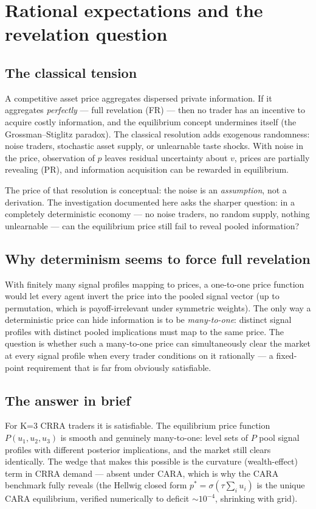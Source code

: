\documentclass[11pt]{report}
\begin{document}
\chapter{Rational expectations and the revelation question}

\section{The classical tension}
A competitive asset price aggregates dispersed private information. If
it aggregates \emph{perfectly} --- full revelation (FR) --- then no
trader has an incentive to acquire costly information, and the
equilibrium concept undermines itself (the Grossman--Stiglitz paradox).
The classical resolution adds exogenous randomness: noise traders,
stochastic asset supply, or unlearnable taste shocks. With noise in the
price, observation of $p$ leaves residual uncertainty about $v$, prices
are partially revealing (PR), and information acquisition can be
rewarded in equilibrium.

The price of that resolution is conceptual: the noise is an
\emph{assumption}, not a derivation. The investigation documented here
asks the sharper question: in a completely deterministic economy ---
no noise traders, no random supply, nothing unlearnable --- can the
equilibrium price still fail to reveal pooled information?

\section{Why determinism seems to force full revelation}
With finitely many signal profiles mapping to prices, a one-to-one price
function would let every agent invert the price into the pooled signal
vector (up to permutation, which is payoff-irrelevant under symmetric
weights). The only way a deterministic price can hide information is to
be \emph{many-to-one}: distinct signal profiles with distinct pooled
implications must map to the same price. The question is whether such a
many-to-one price can simultaneously clear the market at every signal
profile when every trader conditions on it rationally --- a fixed-point
requirement that is far from obviously satisfiable.

\section{The answer in brief}
For K=3 CRRA traders it is satisfiable. The equilibrium price function
$P(u_1, u_2, u_3)$ is smooth and genuinely many-to-one: level sets of
$P$ pool signal profiles with different posterior implications, and the
market still clears identically. The wedge that makes this possible is
the curvature (wealth-effect) term in CRRA demand --- absent under CARA,
which is why the CARA benchmark fully reveals (the Hellwig closed form
$p^* = \sigma(\tau \sum_i u_i)$ is the unique CARA equilibrium, verified
numerically to deficit $\sim 10^{-4}$, shrinking with grid).
\end{document}
